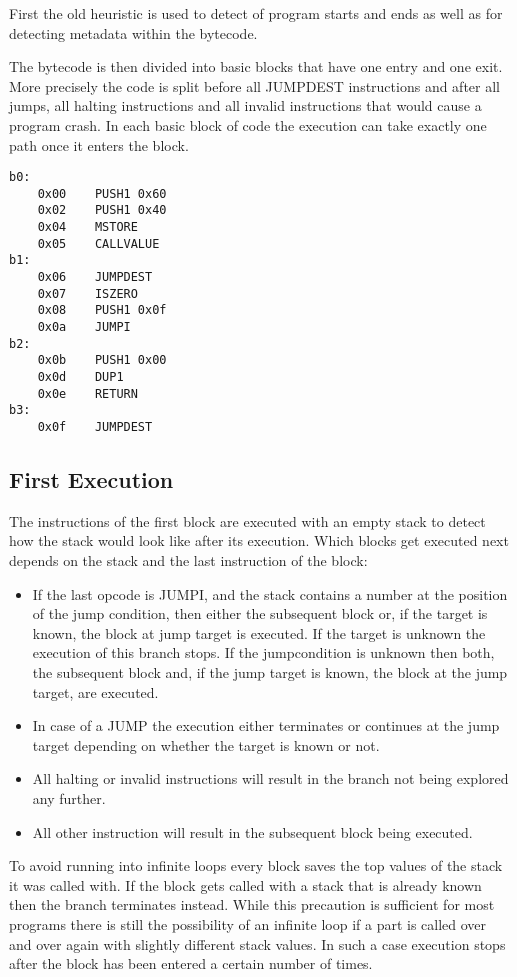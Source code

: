 \documentclass{article}
\begin{document}
First the old heuristic is used to detect of program starts and ends as well as for detecting metadata within the bytecode. 

The bytecode is then divided into basic blocks that have one entry and one exit. More precisely the code is split before all JUMPDEST instructions and after all jumps, all halting instructions and all invalid instructions that would cause a program crash. In each basic block of code the execution can take exactly one path once it enters the block.

\label{code block example}
\begin{lstlisting}[caption=code block example,basicstyle=\small]
b0:
    0x00    PUSH1 0x60
    0x02    PUSH1 0x40
    0x04    MSTORE
    0x05    CALLVALUE
b1:
    0x06    JUMPDEST
    0x07    ISZERO
    0x08    PUSH1 0x0f
    0x0a    JUMPI
b2:
    0x0b    PUSH1 0x00
    0x0d    DUP1
    0x0e    RETURN
b3:
    0x0f    JUMPDEST
\end{lstlisting}

\subsection{First Execution}
\label{firstexec}
    The instructions of the first block are executed with an empty stack to detect how the stack would look like after its execution. Which blocks get executed next depends on the stack and the last instruction of the block:
\begin{itemize}
    \item If the last opcode is JUMPI, and the stack contains a number at the position of the jump condition, then either the subsequent block or, if the target is known, the block at jump target is executed. If the target is unknown the execution of this branch stops. If the jumpcondition is unknown then both, the subsequent block and, if the jump target is known, the block at the jump target, are executed.
    \item In case of a JUMP the execution either terminates or continues at the jump target depending on whether the target is known or not.
    \item All halting or invalid instructions will result in the branch not being explored any further.
    \item All other instruction will result in the subsequent block being executed.
\end{itemize}

    To avoid running into infinite loops every block saves the top values of the stack it was called with. If the block gets called with a stack that is already known then the branch terminates instead. While this precaution is sufficient for most programs there is still the possibility of an infinite loop if a part is called over and over again with slightly different stack values. In such a case execution stops after the block has been entered a certain number of times.
\end{document}
